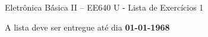 \documentclass[addpoints]{exam}
\begin{document}
 
\begin{center}
Eletrônica Básica II – EE640 U - Lista de Exercícios 1
\end{center}
 
\vspace{5mm}
 
\hfill
{}

\begin{center}
A lista deve ser entregue até dia \textbf{01-01-1968}
\end{center}

\hspace{2mm}

\begin{center}
\gradetable[h][questions]
\end{center}

\hspace{2mm}
\end{document}
